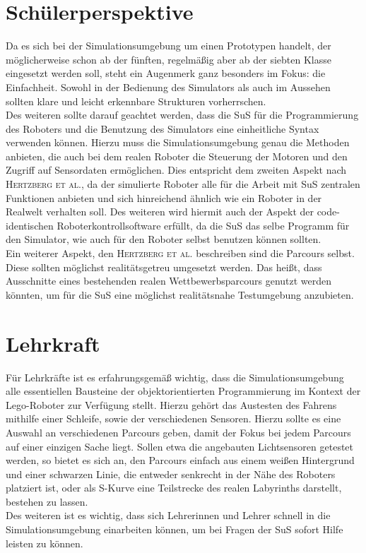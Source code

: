 \documentclass[paper=a4, pagesize, DIV=calc, BCOR=12.5mm, twoside=on, onecolumn=on, open = any, titlepage =on, parskip =half-, headsepline = on, footsepline = on, chapterprefix = on, appendixprefix = off, fontsize = 12pt, numbers = noenddot, abstract = on]{scrbook}
\numberwithin{equation}{chapter}
\theoremstyle{definition}
\theoremstyle{plain}
\theoremstyle{plain}
\theoremstyle{remark}
\theoremstyle{plain}
\theoremstyle{plain}
\begin{document}
\par \singlespacing
\section{Schülerperspektive}
\label{sec:schüler}
\onehalfspacing
Da es sich bei der Simulationsumgebung um einen Prototypen handelt, der möglicherweise schon ab der fünften, regelmäßig aber ab der siebten Klasse eingesetzt werden soll, steht ein Augenmerk ganz besonders im Fokus: die Einfachheit. Sowohl in der Bedienung des Simulators als auch im Aussehen sollten klare und leicht erkennbare Strukturen vorherrschen.\\

Des weiteren sollte darauf geachtet werden, dass die SuS für die Programmierung des Roboters und die Benutzung des Simulators eine einheitliche Syntax verwenden können. Hierzu muss die Simulationsumgebung genau die Methoden anbieten, die auch bei dem realen Roboter die Steuerung der Motoren und den Zugriff auf Sensordaten ermöglichen. Dies entspricht dem zweiten Aspekt nach \textsc{Hertzberg et al.}, da der simulierte Roboter alle für die Arbeit mit SuS zentralen Funktionen anbieten und sich hinreichend ähnlich wie ein Roboter in der Realwelt verhalten soll. Des weiteren wird hiermit auch der Aspekt der code-identischen Roboterkontrollsoftware erfüllt, da die SuS das selbe Programm für den Simulator, wie auch für den Roboter selbst benutzen können sollten.\\

Ein weiterer Aspekt, den \textsc{Hertzberg et al.} beschreiben sind die Parcours selbst. Diese sollten möglichst realitätsgetreu umgesetzt werden. Das heißt, dass Ausschnitte eines bestehenden realen Wettbewerbsparcours genutzt werden könnten, um für die SuS eine möglichst realitätsnahe Testumgebung anzubieten.\\
\par \singlespacing
\section{Lehrkraft}
\label{sec:lehrkraft}
\par \onehalfspacing
Für Lehrkräfte ist es erfahrungsgemäß wichtig, dass die Simulationsumgebung alle essentiellen Bausteine der objektorientierten Programmierung im Kontext der Lego-Roboter zur Verfügung stellt. Hierzu gehört das Austesten des Fahrens mithilfe einer Schleife, sowie der verschiedenen Sensoren. Hierzu sollte es eine Auswahl an verschiedenen Parcours geben, damit der Fokus bei jedem Parcours auf einer einzigen Sache liegt. Sollen etwa die angebauten Lichtsensoren getestet werden, so bietet es sich an, den Parcours einfach aus einem weißen Hintergrund und einer schwarzen Linie, die entweder senkrecht in der Nähe des Roboters platziert ist, oder als S-Kurve eine Teilstrecke des realen Labyrinths darstellt, bestehen zu lassen.\\
Des weiteren ist es wichtig, dass sich Lehrerinnen und Lehrer schnell in die Simulationsumgebung einarbeiten können, um bei Fragen der SuS sofort Hilfe leisten zu können.
\end{document}
